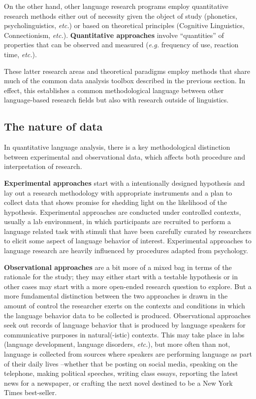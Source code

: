 \documentclass[
  letterpaper,
  krantz1]{latex/krantz-mod}
\theoremstyle{definition}
\theoremstyle{definition}
\theoremstyle{remark}
\begin{document}
On the other hand, other language research programs employ quantitative
research methods either out of necessity given the object of study
(phonetics, psycholinguistics, \emph{etc.}) or based on theoretical
principles (Cognitive Linguistics, Connectionism, \emph{etc.}).
\textbf{Quantitative approaches} involve ``quantities'' of properties
that can be observed and measured (\emph{e.g.} frequency of use,
reaction time, \emph{etc.}).

These latter research areas and theoretical paradigms employ methods
that share much of the common data analysis toolbox described in the
previous section. In effect, this establishes a common methodological
language between other language-based research fields but also with
research outside of linguistics.

\subsection{The nature of data}\label{the-nature-of-data}

In quantitative language analysis, there is a key methodological
distinction between experimental and observational data, which affects
both procedure and interpretation of research.

\textbf{Experimental approaches} start with a intentionally designed
hypothesis and lay out a research methodology with appropriate
instruments and a plan to collect data that shows promise for shedding
light on the likelihood of the hypothesis. Experimental approaches are
conducted under controlled contexts, usually a lab environment, in which
participants are recruited to perform a language related task with
stimuli that have been carefully curated by researchers to elicit some
aspect of language behavior of interest. Experimental approaches to
language research are heavily influenced by procedures adapted from
psychology.

\textbf{Observational approaches} are a bit more of a mixed bag in terms
of the rationale for the study; they may either start with a testable
hypothesis or in other cases may start with a more open-ended research
question to explore. But a more fundamental distinction between the two
approaches is drawn in the amount of control the researcher exerts on
the contexts and conditions in which the language behavior data to be
collected is produced. Observational approaches seek out records of
language behavior that is produced by language speakers for
communicative purposes in natural(-istic) contexts. This may take place
in labs (language development, language disorders, \emph{etc.}), but
more often than not, language is collected from sources where speakers
are performing language as part of their daily lives --whether that be
posting on social media, speaking on the telephone, making political
speeches, writing class essays, reporting the latest news for a
newspaper, or crafting the next novel destined to be a New York Times
best-seller.
\end{document}
